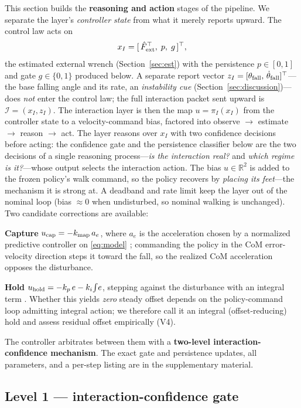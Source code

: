 \documentclass[journal]{IEEEtran}
\begin{document}
This section builds the \textbf{reasoning and action} stages of the pipeline. We separate the layer's \emph{controller state} from what it merely reports upward. The control law acts on
\begin{equation}
x_I=[\,\hat F_{\rm ext}^\top,\; p,\; g\,]^\top,
\label{eq:istate}
\end{equation}
the estimated external wrench (Section~\ref{sec:est}) with the persistence $p\in[0,1]$ and gate $g\in\{0,1\}$ produced below. A separate report vector $z_I=[\theta_{\rm fall},\,\dot\theta_{\rm fall}]^\top$---the base falling angle and its rate, an \emph{instability cue} (Section~\ref{sec:discussion})---does \emph{not} enter the control law; the full interaction packet sent upward is $\mathcal I=(x_I,z_I)$. The interaction layer is then the map $u=\pi_I(x_I)$ from the controller state to a velocity-command bias, factored into observe $\to$ estimate $\to$ reason $\to$ act. The layer reasons over $x_I$ with two confidence decisions before acting: the confidence gate and the persistence classifier below are the two decisions of a single reasoning process---\emph{is the interaction real?} and \emph{which regime is it?}---whose output selects the interaction action. The bias $u\in\mathbb{R}^2$ is added to the frozen policy's walk command, so the policy recovers by \emph{placing its feet}---the mechanism it is strong at. A deadband and rate limit keep the layer out of the nominal loop (bias $\approx 0$ when undisturbed, so nominal walking is unchanged). Two candidate corrections are available:

\textbf{Capture} $u_{\rm cap}=-k_{\rm map}\,a_e$, where $a_e$ is the acceleration chosen by a normalized predictive controller on \eqref{eq:model} \cite{r1}; commanding the policy in the CoM error-velocity direction steps it toward the fall, so the realized CoM acceleration opposes the disturbance.

\textbf{Hold} $u_{\rm hold}=-k_p\,e-k_i\!\int\! e$, stepping against the disturbance with an integral term \cite{r19}. Whether this yields \emph{zero} steady offset depends on the policy-command loop admitting integral action; we therefore call it an integral (offset-reducing) hold and assess residual offset empirically (V4).

The controller arbitrates between them with a \textbf{two-level interaction-confidence mechanism}. The exact gate and persistence updates, all parameters, and a per-step listing are in the supplementary material.

\subsection{Level 1 --- interaction-confidence gate}
\label{sec:gate}
\end{document}
